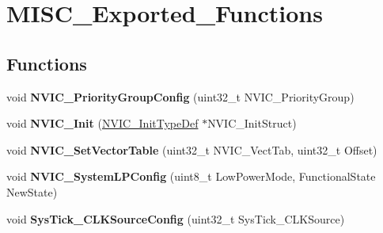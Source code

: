 \hypertarget{group__MISC__Exported__Functions}{
\section{MISC\_\-Exported\_\-Functions}
\label{group__MISC__Exported__Functions}
}
\subsection*{Functions}
\begin{DoxyCompactItemize}
\item 
\hypertarget{group__MISC__Exported__Functions_gadfb1f34f803ce54c976643db8c484442}{
void {\bfseries NVIC\_\-PriorityGroupConfig} (uint32\_\-t NVIC\_\-PriorityGroup)}
\label{group__MISC__Exported__Functions_gadfb1f34f803ce54c976643db8c484442}

\item 
\hypertarget{group__MISC__Exported__Functions_ga4ab373ed0870c06fca5eb51d639adf41}{
void {\bfseries NVIC\_\-Init} (\hyperlink{structNVIC__InitTypeDef}{NVIC\_\-InitTypeDef} $\ast$NVIC\_\-InitStruct)}
\label{group__MISC__Exported__Functions_ga4ab373ed0870c06fca5eb51d639adf41}

\item 
\hypertarget{group__MISC__Exported__Functions_ga1145208ad70edfc2fab19b8b8ef1b1a1}{
void {\bfseries NVIC\_\-SetVectorTable} (uint32\_\-t NVIC\_\-VectTab, uint32\_\-t Offset)}
\label{group__MISC__Exported__Functions_ga1145208ad70edfc2fab19b8b8ef1b1a1}

\item 
\hypertarget{group__MISC__Exported__Functions_gae21011c5232f5b8f366acbecd12a1d4a}{
void {\bfseries NVIC\_\-SystemLPConfig} (uint8\_\-t LowPowerMode, FunctionalState NewState)}
\label{group__MISC__Exported__Functions_gae21011c5232f5b8f366acbecd12a1d4a}

\item 
\hypertarget{group__MISC__Exported__Functions_ga2777d255bb06ad62bb6372a9db1ff385}{
void {\bfseries SysTick\_\-CLKSourceConfig} (uint32\_\-t SysTick\_\-CLKSource)}
\label{group__MISC__Exported__Functions_ga2777d255bb06ad62bb6372a9db1ff385}

\end{DoxyCompactItemize}
